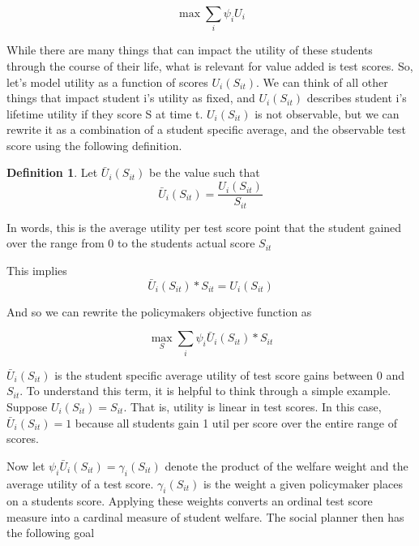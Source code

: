 \documentclass{article}
\theoremstyle{definition}
\theoremstyle{definition}
\theoremstyle{definition}
\theoremstyle{definition}
\newtheorem{definition}{Definition}
\begin{document}
    \begin{equation}
     \max \sum_i \psi_i U_{i}
    \end{equation}
    
    While there are many things that can impact the utility of these students through the course of their life, what is relevant for value added is test scores. So, let's model utility as a function of scores $U_{i}(S_{it})$. We can think of all other things that impact student i's utility as fixed, and $U_{i}(S_{it})$ describes student i's lifetime utility if they score S at time t.  $U_{i}(S_{it})$ is not observable, but we can rewrite it as a combination of a student specific average, and the observable test score using the following definition. 
  
    \begin{definition}
    
    Let $\bar{U}_{i}(S_{it})$ be the value such that 
    \begin{equation}
         \bar{U}_{i}(S_{it}) = \frac{U_{i}(S_{it})}{S_{it}}
    \end{equation}
    
    In words, this is the average utility per test score point that the student gained over the range from 0 to the students actual score $S_{it}$  
    
    This implies
    \begin{equation}
        \bar{U}_{i}(S_{it}) * S_{it} = U_{i}(S_{it})
    \end{equation}
    \end{definition}
    
    And so we can rewrite the policymakers objective function as 
    
    \begin{equation}
       \max_S  \sum_i \psi_i \bar{U}_{i}(S_{it}) * S_{it}
    \end{equation}
    
    
    $\bar{U}_{i}(S_{it}) $ is the student specific average utility of test score gains between $0$ and $S_{it}$. To understand this term, it is helpful to think through a simple example. Suppose $U_{i}(S_{it}) =S_{it}$. That is, utility is linear in test scores. In this case, $ \bar{U}_{i}(S_{it}) = 1$ because all students gain 1 util per score over the entire range of scores. 
    
    Now let $\psi_i \bar{U}_{i}(S_{it}) = \gamma_i(S_{it})$ denote the product of the welfare weight and the average utility of a test score. $\gamma_i(S_{it})$ is the weight a given policymaker places on a students score. Applying these weights converts an ordinal test score measure into a cardinal measure of student welfare. The social planner then has the following goal
    
\end{document}
